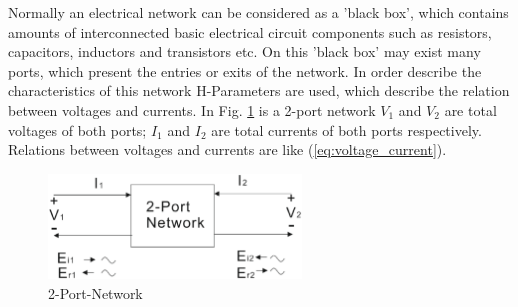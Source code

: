 Normally an electrical network can be considered as a 'black box', which contains amounts of interconnected basic electrical circuit components such as resistors, capacitors, inductors and transistors etc. On this 'black box' may exist many ports, which present the entries or exits of the network. In order describe the characteristics of this network H-Parameters are used, which describe the relation between voltages and currents. In Fig. \ref{fig:2_port_network} is a 2-port network $V_{1}$ and $V_{2}$ are total voltages of both ports; $I_{1}$ and $I_{2}$ are total currents of both ports respectively. Relations between voltages and currents are like (\ref{eq:voltage_current}). 
\begin{figure}[!ht]
\centering
\includegraphics[width=0.6\textwidth]{bilder/s_parameters}
\caption{2-Port-Network \cite{aglient_s_parameters}}
\label{fig:2_port_network}
\end{figure}

